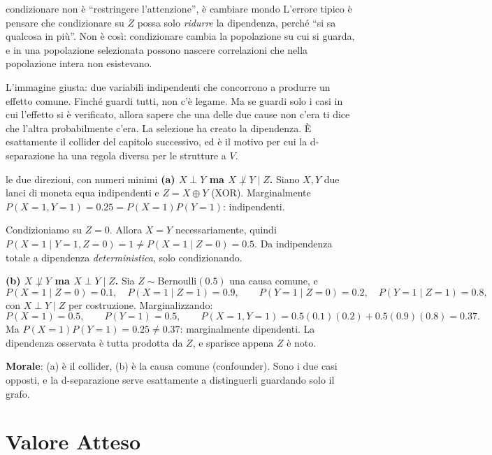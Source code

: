 \begin{intuizione}{condizionare non è ``restringere l'attenzione'', è cambiare mondo}
L'errore tipico è pensare che condizionare su $Z$ possa solo \emph{ridurre} la dipendenza, perché ``si sa qualcosa in più''. Non è così: condizionare cambia la popolazione su cui si guarda, e in una popolazione selezionata possono nascere correlazioni che nella popolazione intera non esistevano.

L'immagine giusta: due variabili indipendenti che concorrono a produrre un effetto comune. Finché guardi tutti, non c'è legame. Ma se guardi solo i casi in cui l'effetto si è verificato, allora sapere che una delle due cause non c'era ti dice che l'altra probabilmente c'era. La selezione ha creato la dipendenza. È esattamente il collider del capitolo successivo, ed è il motivo per cui la d-separazione ha una regola diversa per le strutture a $V$.
\end{intuizione}

\begin{esempiosvolto}{le due direzioni, con numeri minimi}
\textbf{(a) $X \perp Y$ ma $X \not\perp Y \mid Z$.} Siano $X, Y$ due lanci di moneta equa indipendenti e $Z = X \oplus Y$ (XOR). Marginalmente $P(X{=}1,Y{=}1) = 0.25 = P(X{=}1)P(Y{=}1)$: indipendenti.

Condizioniamo su $Z{=}0$. Allora $X = Y$ necessariamente, quindi $P(X{=}1 \mid Y{=}1, Z{=}0) = 1 \neq P(X{=}1 \mid Z{=}0) = 0.5$. Da indipendenza totale a dipendenza \emph{deterministica}, solo condizionando.

\medskip
\textbf{(b) $X \not\perp Y$ ma $X \perp Y \mid Z$.} Sia $Z \sim \text{Bernoulli}(0.5)$ una causa comune, e
\[
P(X{=}1 \mid Z{=}0) = 0.1, \quad P(X{=}1 \mid Z{=}1) = 0.9, \qquad
P(Y{=}1 \mid Z{=}0) = 0.2, \quad P(Y{=}1 \mid Z{=}1) = 0.8,
\]
con $X \perp Y \mid Z$ per costruzione. Marginalizzando:
\[
P(X{=}1) = 0.5, \qquad P(Y{=}1) = 0.5, \qquad
P(X{=}1, Y{=}1) = 0.5(0.1)(0.2) + 0.5(0.9)(0.8) = 0.37.
\]
Ma $P(X{=}1)P(Y{=}1) = 0.25 \neq 0.37$: marginalmente dipendenti. La dipendenza osservata è tutta prodotta da $Z$, e sparisce appena $Z$ è noto.

\medskip
\textbf{Morale}: (a) è il collider, (b) è la causa comune (confounder). Sono i due casi opposti, e la d-separazione serve esattamente a distinguerli guardando solo il grafo.
\end{esempiosvolto}

\section{Valore Atteso}

